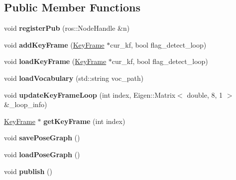 \subsection*{Public Member Functions}
\begin{DoxyCompactItemize}
\item 
\mbox{\label{classPoseGraph_ab19bd20611f26a9abc083b24920eb9d5}} 
void {\bfseries register\+Pub} (ros\+::\+Node\+Handle \&n)
\item 
\mbox{\label{classPoseGraph_ab3fa75350f64624f0c2db3df60bcf030}} 
void {\bfseries add\+Key\+Frame} (\hyperlink{classKeyFrame}{Key\+Frame} $\ast$cur\+\_\+kf, bool flag\+\_\+detect\+\_\+loop)
\item 
\mbox{\label{classPoseGraph_a81b17a724cfe45217f9c9cb5b4a01ac6}} 
void {\bfseries load\+Key\+Frame} (\hyperlink{classKeyFrame}{Key\+Frame} $\ast$cur\+\_\+kf, bool flag\+\_\+detect\+\_\+loop)
\item 
\mbox{\label{classPoseGraph_a49be4623be0d9dfbf4d6eff6a5c69f58}} 
void {\bfseries load\+Vocabulary} (std\+::string voc\+\_\+path)
\item 
\mbox{\label{classPoseGraph_aaa3442ef8c4db9ab67dd9f6e1d0ff679}} 
void {\bfseries update\+Key\+Frame\+Loop} (int index, Eigen\+::\+Matrix$<$ double, 8, 1 $>$ \&\+\_\+loop\+\_\+info)
\item 
\mbox{\label{classPoseGraph_a5189aca4fec528b807f4bb5887ce284e}} 
\hyperlink{classKeyFrame}{Key\+Frame} $\ast$ {\bfseries get\+Key\+Frame} (int index)
\item 
\mbox{\label{classPoseGraph_ad1496be8f0f5583244b64568726493ad}} 
void {\bfseries save\+Pose\+Graph} ()
\item 
\mbox{\label{classPoseGraph_afb4cdc21d3edbe53873d98dd22b5987f}} 
void {\bfseries load\+Pose\+Graph} ()
\item 
\mbox{\label{classPoseGraph_a6340f4e3d29447bbae2b44cfeedf0a27}} 
void {\bfseries publish} ()
\end{DoxyCompactItemize}
